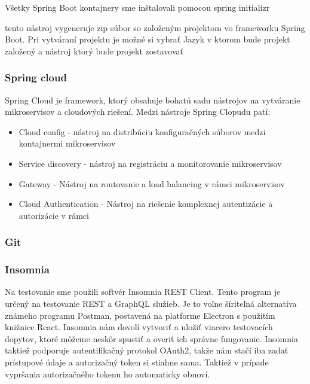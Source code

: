 
Všetky Spring Boot kontajnery sme inštalovali pomocou spring initializr \cite{initializr} 

tento nástroj vygeneruje zip súbor so založeným projektom vo frameworku Spring Boot. Pri vytváraní projektu je možné si vybrať Jazyk v ktorom bude projekt založený a nástroj ktorý bude projekt zostavovať %

\subsubsection{Spring cloud}  

Spring Cloud je framework, ktorý obsahuje bohatú sadu nástrojov na vytváranie mikroservisov a cloudových riešení. Medzi nástroje Spring Clopudu patí:   


\begin{itemize}  
	\item Cloud config - nástroj na distribúciu konfiguračných súborov medzi kontajnermi mikroservisov 
	\item Service discovery - nástroj na registráciu a monitorovanie mikroservisov  
	\item Gateway - Nástroj na routovanie a load balancing v rámci mikroservisov  	
	\item Cloud Authentication - Nástroj na riešenie komplexnej autentizácie a autorizácie v rámci  

\end{itemize}

\subsubsection{Git}

\subsubsection{Insomnia}
Na testovanie sme použili softvér Insomnia REST Client\cite{insomnia}. Tento program je určený na testovanie REST a GraphQL služieb. Je to voľne šíriteľná alternatíva známeho programu Postman, postavená na platforme Electron s použitím knižnice React. Insomnia nám dovolí vytvoriť a uložiť viacero testovacích dopytov, ktoré môžeme neskôr spustiť a overiť ich správne fungovanie. Insomnia taktiež podporuje autentifikačný protokol OAuth2, takže nám stačí iba zadať prístupové údaje a autorizačný token si stiahne sama. Taktiež v prípade vypršania autorizačného tokenu ho automaticky obnoví.  




